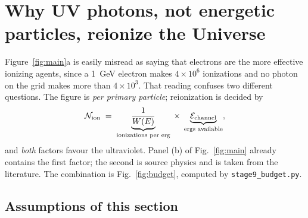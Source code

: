 \documentclass[11pt,a4paper]{article}
\begin{document}
\section{Why UV photons, not energetic particles, reionize the Universe}
\label{sec:why}

Figure~\ref{fig:main}a is easily misread as saying that electrons are the more
effective ionizing agents, since a \SI{1}{\giga\electronvolt} electron makes
$4\times10^{6}$ ionizations and no photon on the grid makes more than
$4\times10^{3}$. That reading confuses two different questions. The figure is
\emph{per primary particle}; reionization is decided by
\begin{equation}
  \mathcal{N}_{\rm ion}
  \;=\;
  \underbrace{\frac{1}{W(E)}}_{\text{ionizations per erg}}
  \;\times\;
  \underbrace{\mathcal{E}_{\rm channel}}_{\text{ergs available}} ,
  \label{eq:budget}
\end{equation}
and \emph{both} factors favour the ultraviolet. Panel (b) of
Fig.~\ref{fig:main} already contains the first factor; the second is source
physics and is taken from the literature. The combination is
Fig.~\ref{fig:budget}, computed by \texttt{stage9\_budget.py}.

\subsection{Assumptions of this section}
\end{document}
